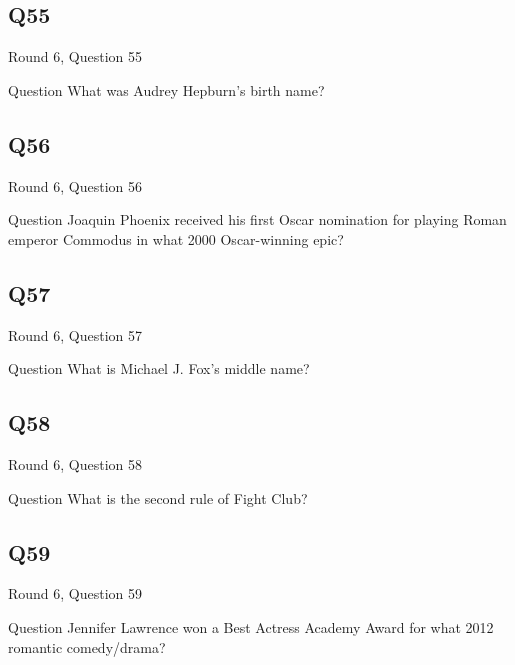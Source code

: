 \documentclass[11pt]{beamer}
\begin{document}
\subsection*{Q55}
\begin{frame}[t]{Round 6, Question 55}
\vspace{2em}
\begin{block}{Question}
What was Audrey Hepburn's birth name?
\end{block}
\end{frame}
    

\subsection*{Q56}
\begin{frame}[t]{Round 6, Question 56}
\vspace{2em}
\begin{block}{Question}
Joaquin Phoenix received his first Oscar nomination for playing Roman emperor Commodus in what 2000 Oscar-winning epic?
\end{block}
\end{frame}
    

\subsection*{Q57}
\begin{frame}[t]{Round 6, Question 57}
\vspace{2em}
\begin{block}{Question}
What is Michael J. Fox's middle name?
\end{block}
\end{frame}
    

\subsection*{Q58}
\begin{frame}[t]{Round 6, Question 58}
\vspace{2em}
\begin{block}{Question}
What is the second rule of Fight Club?
\end{block}
\end{frame}
    

\subsection*{Q59}
\begin{frame}[t]{Round 6, Question 59}
\vspace{2em}
\begin{block}{Question}
Jennifer Lawrence won a Best Actress Academy Award for what 2012 romantic comedy/drama?
\end{block}
\end{frame}
    
\end{document}
